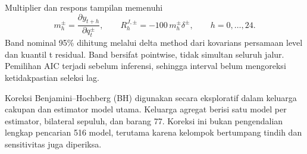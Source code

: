 Multiplier dan respons tampilan memenuhi
\begin{equation}
 m_h^\pm=\frac{\partial y_{t+h}}{\partial q_t^\pm},\qquad
 R_h^{J,\pm}=-100\,m_h^\pm\delta^\pm,\qquad h=0,\ldots,24.
\end{equation}
Band nominal 95\% dihitung melalui delta method dari kovarians persamaan level dan kuantil t residual. Band bersifat pointwise, tidak simultan seluruh jalur. Pemilihan AIC terjadi sebelum inferensi, sehingga interval belum mengoreksi ketidakpastian seleksi lag.

Koreksi Benjamini--Hochberg (BH) \cite{bh} digunakan secara eksploratif dalam keluarga cakupan dan estimator model utama. Keluarga agregat berisi satu model per estimator, bilateral sepuluh, dan barang 77. Koreksi ini bukan pengendalian lengkap pencarian 516 model, terutama karena kelompok bertumpang tindih dan sensitivitas juga diperiksa.

